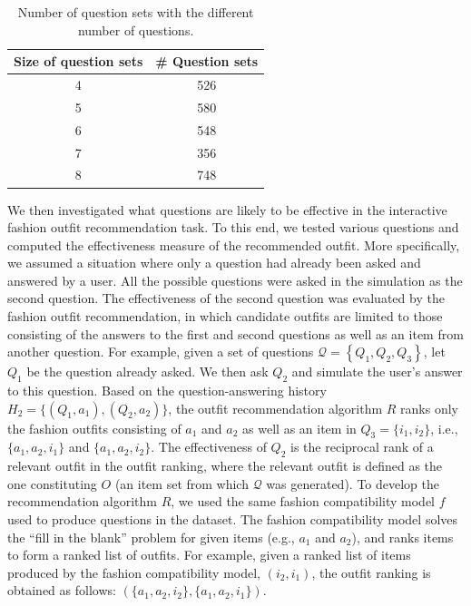 \begin{table}[t]
\caption{Number of question sets with the different number of questions.}
\centering
\begin{tabular}{cc}
\toprule
Size of question sets & \# Question sets \\ \midrule
4                & 526                 \\
5                & 580                 \\ 
6                & 548                 \\ 
7                & 356                 \\ 
8                & 748                 \\ \bottomrule
\end{tabular}
\label{dataset-sets-stats}
\end{table}

We then investigated what questions are likely to be effective in the interactive fashion outfit recommendation task.
To this end, we tested various questions and computed the effectiveness measure of the recommended outfit. 
More specifically, we assumed a situation where only a question had already been asked and answered by a user. 
All the possible questions were asked in the simulation as the second question.
The effectiveness of the second question was evaluated by the fashion outfit recommendation,
in which candidate outfits are limited to those consisting of the answers to the first and second questions as well as an item from another question. 
For example, given a set of questions $\mathcal{Q} = \left\{ Q_1, Q_2, Q_3 \right\}$, let $Q_1$ be the question already asked.
We then ask $Q_2$ and simulate the user's answer to this question.
Based on the question-answering history $H_2 = \{(Q_1, a_1), (Q_2, a_2)\}$, 
the outfit recommendation algorithm $R$
ranks only the fashion outfits consisting of $a_1$ and $a_2$ as well as an item in $Q_3 = \{i_1, i_2\}$, i.e., $\{a_1, a_2, i_1 \}$ and $\{a_1, a_2, i_2 \}$.
The effectiveness of $Q_2$ is the reciprocal rank of a relevant outfit in the outfit ranking,
where the relevant outfit is defined as the one constituting $O$ (an item set from which $\mathcal{Q}$ was generated).
To develop the recommendation algorithm $R$, we used the same fashion compatibility model $f$ used to produce questions in the dataset.
The fashion compatibility model solves the ``fill in the blank'' problem for given items (e.g., $a_1$ and $a_2$), and ranks items to form a ranked list of outfits.
For example, given a ranked list of items produced by the fashion compatibility model,
$(i_2, i_1)$, the outfit ranking is obtained as follows: 
$(\{a_1, a_2, i_2\}, \{a_1, a_2, i_1\})$.


